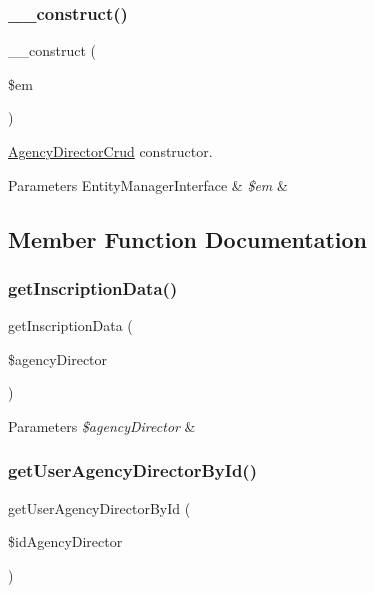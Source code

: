 \subsubsection{\texorpdfstring{\_\_construct()}{\_\_construct()}}
{\footnotesize\ttfamily \+\_\+\+\_\+construct (\begin{DoxyParamCaption}\item[{Entity\+Manager\+Interface}]{\$em }\end{DoxyParamCaption})}

\mbox{\hyperlink{class_app_1_1_d_a_l_1_1_agency_director_crud}{Agency\+Director\+Crud}} constructor. 
\begin{DoxyParams}[1]{Parameters}
Entity\+Manager\+Interface & {\em \$em} & \\
\hline
\end{DoxyParams}


\subsection{Member Function Documentation}
\mbox{\label{class_app_1_1_d_a_l_1_1_agency_director_crud_a2f9f5d8efbb2c982b25b0c6be48a9c83}} 
\subsubsection{\texorpdfstring{getInscriptionData()}{getInscriptionData()}}
{\footnotesize\ttfamily get\+Inscription\+Data (\begin{DoxyParamCaption}\item[{}]{\$agency\+Director }\end{DoxyParamCaption})}


\begin{DoxyParams}{Parameters}
{\em \$agency\+Director} & \\
\hline
\end{DoxyParams}
\mbox{\label{class_app_1_1_d_a_l_1_1_agency_director_crud_ae27eb391f20086756b695081f4e80fb4}} 
\subsubsection{\texorpdfstring{getUserAgencyDirectorById()}{getUserAgencyDirectorById()}}
{\footnotesize\ttfamily get\+User\+Agency\+Director\+By\+Id (\begin{DoxyParamCaption}\item[{}]{\$id\+Agency\+Director }\end{DoxyParamCaption})}



